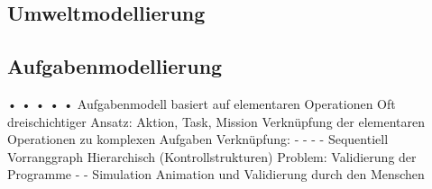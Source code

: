 \subsection{Umweltmodellierung}
\subsection{Aufgabenmodellierung}
•
•
•
•
•
Aufgabenmodell basiert auf elementaren Operationen
Oft dreischichtiger Ansatz: Aktion, Task, Mission
Verknüpfung der elementaren Operationen zu komplexen Aufgaben
Verknüpfung:
-
-
-
-
Sequentiell
Vorranggraph
Hierarchisch
(Kontrollstrukturen)
Problem: Validierung der Programme
-
-
Simulation
Animation und Validierung durch den Menschen
%